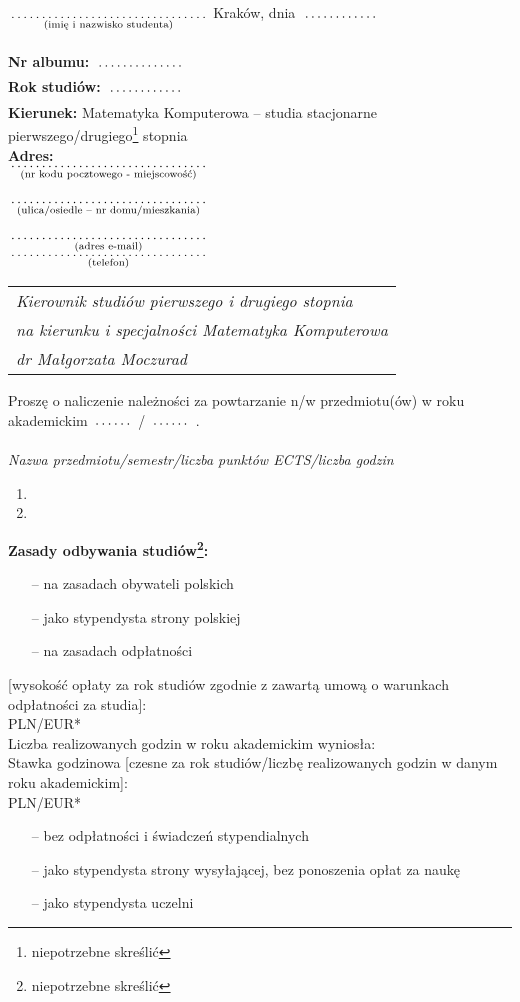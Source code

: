 \documentclass[a4paper,11pt]{article}
\newcommand{\fillField}[2]{
    $\underset{\text{#1}}{\parbox[t]{#2}{\dotfill}}$
}
\begin{document}
\noindent
\fillField{(imię i nazwisko studenta)}{5cm} \hfill Kraków, dnia \fillField{}{2cm} \\\\
\textbf{Nr albumu:}   \fillField{}{2.3cm}\\
\textbf{Rok studiów:} \fillField{}{2cm}\\
\textbf{Kierunek:} Matematyka Komputerowa -- studia stacjonarne pierwszego/drugiego\footnote[1]{niepotrzebne skreślić} stopnia\\
\textbf{Adres:}\\
\fillField{(nr kodu pocztowego - miejscowość)}{5cm}\\\\
\fillField{(ulica/osiedle – nr domu/mieszkania)}{5cm}\\\\
\fillField{(adres e-mail)}{5cm}\\
\fillField{(telefon)}{5cm}
\phantom{a}\hfill
\begin{tabular}[c]{@{}l@{}}
\textit{Kierownik studiów pierwszego i drugiego stopnia} \\
\textit{na kierunku i specjalności Matematyka Komputerowa}\\
\textit{dr Małgorzata Moczurad}
\end{tabular}

\vskip 1.0cm

\noindent
Proszę o naliczenie należności za powtarzanie n/w przedmiotu(ów) w roku\\ akademickim \fillField{}{1cm}/\fillField{}{1cm}.

\noindent
\textit{Nazwa przedmiotu/semestr/liczba punktów ECTS/liczba godzin}
\begin{enumerate}
    \item \dotfill
    \item \dotfill
\end{enumerate}{\footnotesize
\textbf{Zasady odbywania studiów\footnote[1]{niepotrzebne skreślić}:}
\begin{itemize}
    \itemsep-0.7em
    \item[--] na zasadach obywateli polskich
    \item[--] jako stypendysta strony polskiej
    \item[--] na zasadach odpłatności
\end{itemize}
[wysokość opłaty za rok studiów zgodnie z zawartą umową o warunkach odpłatności za studia]: \dotfill\\ PLN/EUR*\\
Liczba realizowanych godzin w roku akademickim \dotfill wyniosła: \dotfill\\
Stawka godzinowa [czesne za rok studiów/liczbę realizowanych godzin w danym roku akademickim]: \dotfill\\ PLN/EUR*
\begin{itemize}
    \itemsep-0.7em
    \item[--] bez odpłatności i świadczeń stypendialnych
    \item[--] jako stypendysta strony wysyłającej, bez ponoszenia opłat za naukę
    \item[--] jako stypendysta uczelni
\end{itemize}
}
\end{document}
